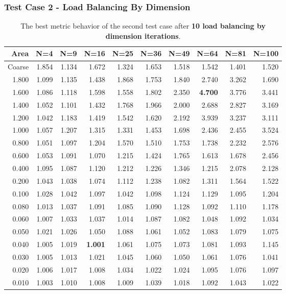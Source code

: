 \documentclass[compress]{beamer}
\begin{document}
\begin{frame}[t]\frametitle{Test Case 2 - Load Balancing By Dimension}
\begin{table}[H]
\tiny
\centering
\caption{The best metric behavior of the second test case after \textbf{10 load balancing by dimension iterations}.} 
\begin{tabular}{rrrrrrrrrr}
 \hline
 Area & N=4 & N=9 & N=16 & N=25 & N=36 & N=49 & N=64 & N=81 & N=100 \\ 
\hline
 Coarse & 1.854 & 1.134 & 1.672 & 1.324 & 1.653 & 1.518 & 1.542 & 1.401 & 1.520 \\
  1.800 & 1.099 & 1.135 & 1.438 & 1.868 & 1.753 & 1.840 & 2.740 & 3.262 & 1.690 \\
  1.600 & 1.086 & 1.118 & 1.598 & 1.558 & 1.802 & 2.350 & \textbf{\cellcolor{blue!25}4.700} & 3.776 & 3.441 \\
  1.400 & 1.052 & 1.101 & 1.432 & 1.768 & 1.966 & 2.000 & 2.688 & 2.827 & 3.169 \\
  1.200 & 1.042 & 1.183 & 1.419 & 1.542 & 1.620 & 2.192 & 3.939 & 3.237 & 3.111 \\
  1.000 & 1.057 & 1.207 & 1.315 & 1.331 & 1.453 & 1.698 & 2.436 & 2.455 & 3.524 \\
  0.800 & 1.051 & 1.097 & 1.204 & 1.570 & 1.510 & 1.753 & 1.738 & 2.232 & 2.576 \\
  0.600 & 1.053 & 1.091 & 1.070 & 1.215 & 1.424 & 1.765 & 1.613 & 1.678 & 2.456 \\
  0.400 & 1.095 & 1.087 & 1.120 & 1.212 & 1.226 & 1.346 & 1.215 & 2.078 & 2.128 \\
  0.200 & 1.043 & 1.038 & 1.074 & 1.112 & 1.238 & 1.082 & 1.311 & 1.564 & 1.522 \\
  0.100 & 1.028 & 1.042 & 1.097 & 1.042 & 1.098 & 1.124 & 1.129 & 1.095 & 1.204 \\
  0.080 & 1.013 & 1.037 & 1.091 & 1.085 & 1.090 & 1.128 & 1.092 & 1.110 & 1.178 \\
  0.060 & 1.007 & 1.033 & 1.037 & 1.014 & 1.087 & 1.082 & 1.048 & 1.092 & 1.034 \\
  0.050 & 1.021 & 1.026 & 1.050 & 1.088 & 1.061 & 1.052 & 1.083 & 1.079 & 1.075 \\
  0.040 & 1.005 & 1.019 & \textbf{\cellcolor{blue!25}1.001} & 1.061 & 1.075 & 1.073 & 1.081 & 1.093 & 1.145 \\
  0.030 & 1.005 & 1.013 & 1.021 & 1.045 & 1.060 & 1.050 & 1.061 & 1.076 & 1.041 \\
  0.020 & 1.006 & 1.017 & 1.008 & 1.034 & 1.022 & 1.024 & 1.095 & 1.076 & 1.097 \\
  0.010 & 1.003 & 1.010 & 1.008 & 1.009 & 1.039 & 1.018 & 1.092 & 1.043 & 1.022 \\
\hline
\end{tabular}
\end{table}
\end{frame}
\end{document}
